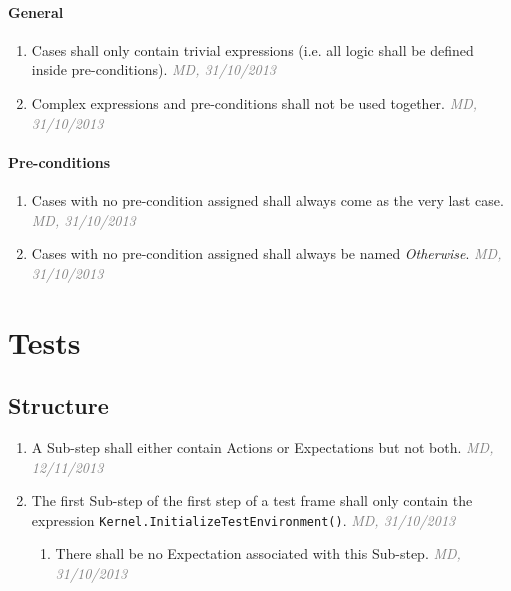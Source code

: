 \documentclass[draft, a4paper, oneside]{scrreprt}
\let\emph\textsl
\newcommand{\literally}[1]{\textsf{\emph{#1}}}
\newcommand{\code}[1]{\lstinline$#1$}
\newcommand{\ruleauthor}[2]{\mbox{}\newline\mbox{}\hfill{\footnotesize\textcolor{gray}{\emph{#1, #2}}}\xspace}}
\newcommand{\ruleauthor}[2]{}
\begin{document}
\subsubsection{General}
\begin{enumerate}
\item \label{rule:functions_cases_general_trivialexpressions} Cases shall only contain trivial expressions (i.e. all logic shall be defined inside pre-conditions). \ruleauthor{MD}{31/10/2013}
\item {} Complex expressions and pre-conditions shall not be used together.  \ruleauthor{MD}{31/10/2013}
\end{enumerate}

\subsubsection{Pre-conditions}
\begin{enumerate}
\item Cases with no pre-condition assigned shall always come as the very last case. \ruleauthor{MD}{31/10/2013}
\item Cases with no pre-condition assigned shall always be named \literally{Otherwise}. \ruleauthor{MD}{31/10/2013}
\end{enumerate}

\chapter{Tests}

\section{Structure}
\begin{enumerate}
\item {} A Sub-step shall either contain Actions or Expectations but not both. \ruleauthor{MD}{12/11/2013}
\item The first Sub-step of the first step of a test frame shall only contain the expression \code{Kernel.InitializeTestEnvironment()}. \ruleauthor{MD}{31/10/2013}
\begin{enumerate}
\item There shall be no Expectation associated with this Sub-step. \ruleauthor{MD}{31/10/2013}
\end{enumerate}
\end{enumerate}
\end{document}
